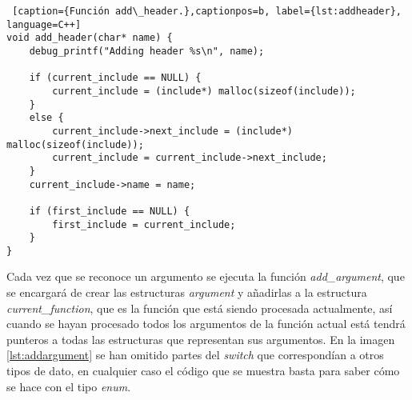 \bigskip

\begin{minipage}{\linewidth}
\begin{lstlisting} [caption={Función add\_header.},captionpos=b, label={lst:addheader}, language=C++]
void add_header(char* name) {
	debug_printf("Adding header %s\n", name);

	if (current_include == NULL) {
		current_include = (include*) malloc(sizeof(include));
	}
	else {
		current_include->next_include = (include*) malloc(sizeof(include));
		current_include = current_include->next_include;
	}
	current_include->name = name;

	if (first_include == NULL) {
		first_include = current_include;
	}
}
\end{lstlisting}
\end{minipage}

\bigskip
Cada vez que se reconoce un argumento se ejecuta la función \textit{add\_argument}, que se encargará de crear las estructuras \textit{argument} y añadirlas a la estructura \textit{current\_function}, que es la función que está siendo procesada actualmente, así cuando se hayan procesado todos los argumentos de la función actual está tendrá punteros a todas las estructuras que representan sus argumentos. En la imagen \ref{lst:addargument} se han omitido partes del \textit{switch} que correspondían a otros tipos de dato, en cualquier caso el código que se muestra basta para saber cómo se hace con el tipo \textit{enum}. 
 \bigskip

